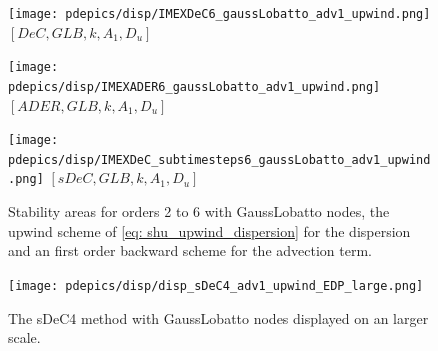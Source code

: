 \begin{figure}[!h]
	\centering
	\begin{minipage}[t]{0.32\textwidth}
		\centering
		\texttt{[image: pdepics/disp/IMEXDeC6\_gaussLobatto\_adv1\_upwind.png]}
		\small$[DeC, GLB,k, A_1,D_u]$\par
	\end{minipage}
	\begin{minipage}[t]{0.32\textwidth}
		\centering
		\texttt{[image: pdepics/disp/IMEXADER6\_gaussLobatto\_adv1\_upwind.png]}
		\small$[ADER, GLB,k, A_1,D_u]$\par
	\end{minipage}
	\begin{minipage}[t]{0.32\textwidth}
		\centering
		\texttt{[image: pdepics/disp/IMEXDeC\_subtimesteps6\_gaussLobatto\_adv1\_upwind.png]}
		\small$[sDeC, GLB,k, A_1,D_u]$\par
	\end{minipage}
	\caption{Stability areas for orders 2 to 6 with GaussLobatto nodes, the upwind scheme of \eqref{eq: shu_upwind_dispersion} for the dispersion and an first order backward scheme for the advection term.}
	\label{fig: disp_allRK_GLB}
\end{figure}

\begin{figure}[!h]
	\centering
	\texttt{[image: pdepics/disp/disp\_sDeC4\_adv1\_upwind\_EDP\_large.png]}
	\caption{The sDeC4 method with GaussLobatto nodes displayed on an larger scale.}
	\label{fig: sDeC4_adv1_upwind_large}
\end{figure}

